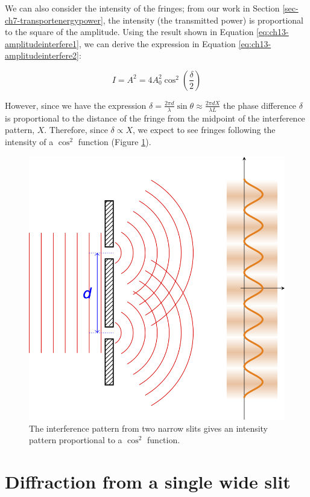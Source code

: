 \documentclass[
]{book}
\begin{document}
We can also consider the intensity of the fringes; from our work in Section \ref{sec-ch7-transportenergypower}, the intensity (the transmitted power) is proportional to the square of the amplitude. Using the result shown in Equation \eqref{eq:ch13-amplitudeinterfere1}, we can derive the expression in Equation \eqref{eq:ch13-amplitudeinterfere2}:

\begin{equation}
I = A^2 = 4 A_0^2 \cos^2 \left(\frac{\delta}{2}\right)
\label{eq:ch13-amplitudeinterfere2}
\end{equation}

However, since we have the expression \(\delta = \frac{2\pi d}{\lambda}\sin\theta \approx \frac{2\pi d X}{\lambda L}\) the phase difference \(\delta\) is proportional to the distance of the fringe from the midpoint of the interference pattern, \(X\). Therefore, since \(\delta \propto X\), we expect to see fringes following the intensity of a \(\cos^2\) function (Figure \ref{fig:ch13-cos2fringes}).

\begin{figure}

{\centering \includegraphics[width=0.7\linewidth]{visualisations/LaTeX/ch13-cos2-interference} 

}

\caption{The interference pattern from two narrow slits gives an intensity pattern proportional to a $\cos^2$ function.}\label{fig:ch13-cos2fringes}
\end{figure}

\hypertarget{sec-ch13-singlewideslit}{%
\section{Diffraction from a single wide slit}\label{sec-ch13-singlewideslit}}
\end{document}
